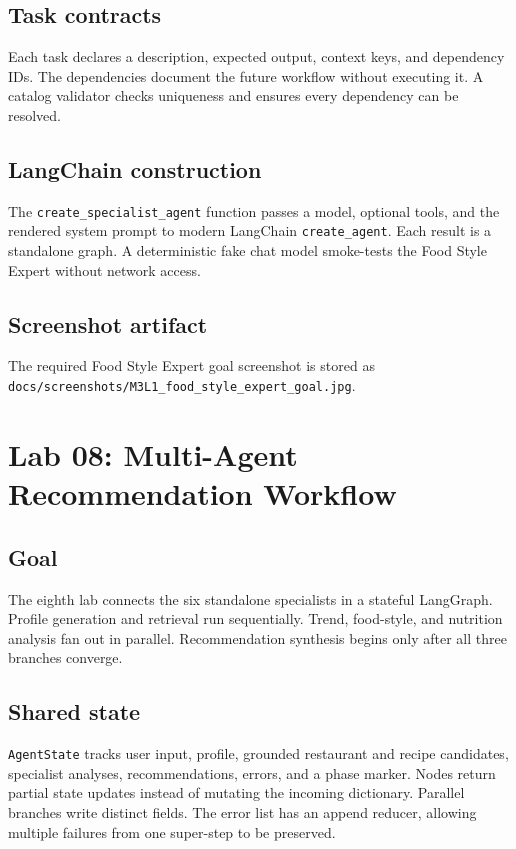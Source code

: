 \documentclass[11pt]{article}
\begin{document}
\subsection{Task contracts}

Each task declares a description, expected output, context keys, and dependency
IDs. The dependencies document the future workflow without executing it. A
catalog validator checks uniqueness and ensures every dependency can be
resolved.

\subsection{LangChain construction}

The \texttt{create\_specialist\_agent} function passes a model, optional tools,
and the rendered system prompt to modern LangChain
\texttt{create\_agent}. Each result is a standalone graph. A deterministic fake
chat model smoke-tests the Food Style Expert without network access.

\subsection{Screenshot artifact}

The required Food Style Expert goal screenshot is stored as
\texttt{docs/screenshots/M3L1\_food\_style\_expert\_goal.jpg}.

\section{Lab 08: Multi-Agent Recommendation Workflow}

\subsection{Goal}

The eighth lab connects the six standalone specialists in a stateful LangGraph.
Profile generation and retrieval run sequentially. Trend, food-style, and
nutrition analysis fan out in parallel. Recommendation synthesis begins only
after all three branches converge.

\subsection{Shared state}

\texttt{AgentState} tracks user input, profile, grounded restaurant and recipe
candidates, specialist analyses, recommendations, errors, and a phase marker.
Nodes return partial state updates instead of mutating the incoming dictionary.
Parallel branches write distinct fields. The error list has an append reducer,
allowing multiple failures from one super-step to be preserved.
\end{document}
